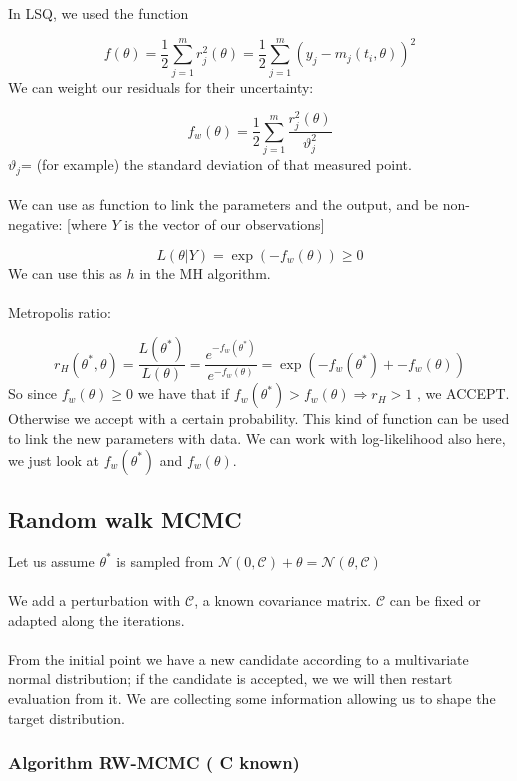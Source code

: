 In LSQ, we used the function

$$
f(\theta)=\frac{1}{2}\sum^m_{j=1}r^2_j(\theta)=\frac{1}{2}\sum^m_{j=1}(y_j-m_j(t_i,\theta))^2
$$
\noindent
We can weight our residuals for their uncertainty:

$$
f_w(\theta)=\frac{1}{2}\sum^m_{j=1} \frac{r^2_j(\theta)}{\vartheta_j^2}
$$
\noindent
$\vartheta_j$= (for example) the standard deviation of that measured
point.
\\
\\
\noindent
We can use as function to link the parameters and the output, and be
non-negative: {[}where $Y$ is the vector of our observations{]}

$$
L(\theta|Y)=\exp(-f_w(\theta)) \geq 0
$$
\noindent
We can use this as $h$ in the MH algorithm.
\\
\\
\noindent
Metropolis ratio:

$$
r_H(\theta^*,\theta)=\frac{L(\theta^*)}{L(\theta)}=\frac{e^{-f_w(\theta^*)}}{e^{-f_w(\theta)}}=\exp(-f_w(\theta^*)+-f_w(\theta))
$$
\noindent
So since $f_w(\theta)\geq0$ we have that if
$f_w(\theta^*) > f_w(\theta) \Rightarrow r_H>1$ , we ACCEPT. Otherwise
we accept with a certain probability. This kind of function can be used
to link the new parameters with data.
\noindent
We can work with log-likelihood also here, we just look at
$f_w(\theta^*)$ and $f_w(\theta)$.


\subsection{Random walk MCMC}

Let us assume $\theta^*$ is sampled from
$\mathcal{N}(0,\mathcal{C})+\theta=\mathcal{N}(\theta,\mathcal{C})$
\\
\\
\noindent
We add a perturbation with $\mathcal{C}$, a known covariance matrix.
$\mathcal{C}$ can be fixed or adapted along the iterations.
\\
\\
\noindent
From the initial point we have a new candidate according to a
multivariate normal distribution; if the candidate is accepted, we we
will then restart evaluation from it. We are collecting some information
allowing us to shape the target distribution.


\subsubsection{Algorithm RW-MCMC ( C known)}

